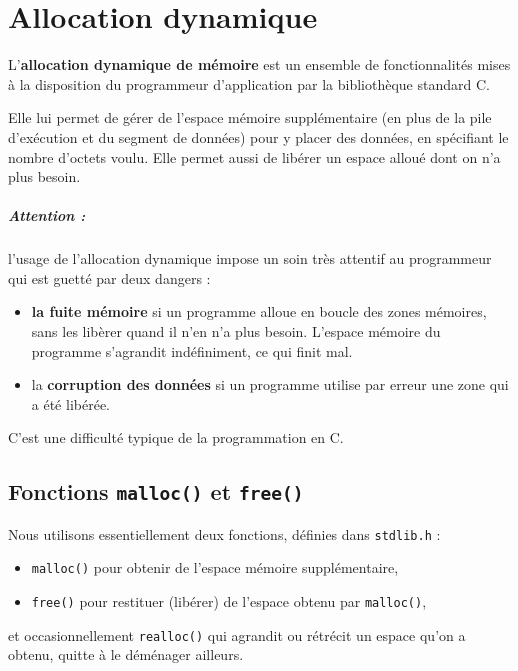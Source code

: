 
\chapter{Allocation dynamique}

L'\textbf{allocation dynamique de mémoire} est un ensemble de 
fonctionnalités mises à la disposition du programmeur d'application
par la bibliothèque standard C.

Elle lui permet de gérer de l'espace mémoire supplémentaire (en plus
de la pile d'exécution et du segment de données) pour y placer des
données, en spécifiant le nombre d'octets voulu. Elle permet aussi
de libérer un espace alloué dont on n'a plus besoin.

\paragraph{Attention :} l'usage de l'allocation dynamique impose un soin très attentif
au programmeur qui est guetté par deux dangers :


\begin{itemize}
\item \textbf{la fuite mémoire} si un programme alloue en boucle des
  zones mémoires, sans les libèrer quand il n'en n'a plus
  besoin. L'espace mémoire du programme s'agrandit indéfiniment, ce
  qui finit mal.
\item la \textbf{corruption des données} 
si un programme utilise par erreur une zone qui a été libérée.
\end{itemize}

C'est une difficulté typique de la programmation en C.

\section{Fonctions \texttt{malloc()} et \texttt{free()}}


Nous utilisons essentiellement deux fonctions, définies dans
\texttt{stdlib.h} : 

\begin{itemize}
\item \texttt{malloc()} pour obtenir de l'espace mémoire supplémentaire,
\item \texttt{free()} pour restituer (libérer) de l'espace obtenu par \texttt{malloc()},
\end{itemize}

et occasionnellement  \texttt{realloc()} qui agrandit ou rétrécit un espace qu'on
a obtenu, quitte à le déménager ailleurs.

